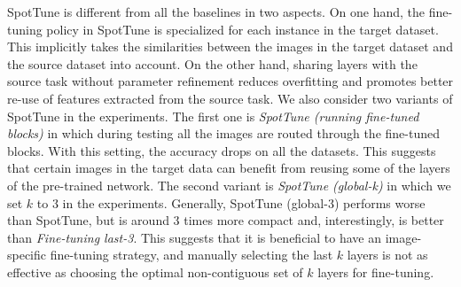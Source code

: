 \documentclass[10pt,twocolumn,letterpaper]{article}
\begin{document}
SpotTune is different from all the baselines in two aspects. On one hand, the fine-tuning policy in SpotTune is specialized for each instance in the target dataset. This implicitly takes the similarities between the images in the target dataset and the source dataset into account. On the other hand, sharing layers with the source task without parameter refinement reduces overfitting and promotes better re-use of features extracted from the source task. 
We also consider two variants of SpotTune in the experiments. The first one is {\em SpotTune (running fine-tuned blocks)} in which during testing all the images are routed through the fine-tuned blocks. With this setting, the accuracy drops on all the datasets. This suggests that certain images in the target data can benefit from reusing some of the layers of the pre-trained network. The second variant is {\em SpotTune (global-k)} in which we set $k$ to 3 in the experiments. Generally, SpotTune (global-3) performs worse than SpotTune, but is around 3 times more compact and, interestingly, is better than {\em Fine-tuning last-3}. This suggests that it is beneficial to have an image-specific fine-tuning strategy, and manually selecting the last $k$ layers is not as effective as choosing the optimal non-contiguous set of $k$ layers for fine-tuning.
\def\arraystretch{1.2}%
	\small
\end{document}

